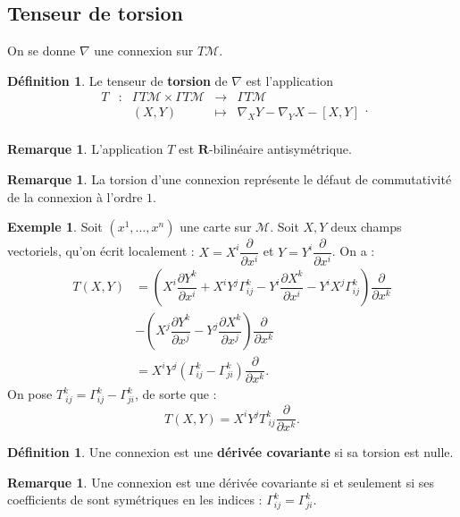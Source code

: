 \documentclass[12pt,a4paper]{article}
\theoremstyle{definition}
\newtheorem{defn}[thm]{Définition}
\newtheorem{ex}[thm]{Exemple}
\newtheorem{rqe}[thm]{Remarque}
\begin{document}
\subsection{Tenseur de torsion}
On se donne $\nabla$ une connexion sur $T\mathcal{M}$.
\begin{defn}
Le tenseur de \textbf{torsion} de $\nabla$ est l'application
$$\begin{array}{ccccc}
T & : & \Gamma T\mathcal{M}\times\Gamma T \mathcal{M} & \to & \Gamma  T\mathcal{M} \\
 & & (X,Y) & \mapsto & \nabla_XY-\nabla_YX-[X,Y]\\
\end{array}.$$
\end{defn}
\begin{rqe}
L'application $T$ est $\mathbf{R}$-bilinéaire antisymétrique.
\end{rqe}
\begin{rqe}
La torsion d'une connexion représente le défaut de commutativité de la connexion à l'ordre $1$.
\end{rqe}
\begin{ex}
Soit $(x^1,\ldots,x^n)$ une carte sur $\mathcal{M}$. Soit $X,Y$ deux champs vectoriels, qu'on écrit localement : $X=X^i\dfrac{\partial}{\partial x^i}$ et $Y=Y^i\dfrac{\partial}{\partial x^i}$. On a :
\begin{align*}
T(X,Y)&=\left(X^i\dfrac{\partial Y^k}{\partial x^i}+X^iY^j\Gamma_{ij}^k-Y^i\dfrac{\partial X^k}{\partial x^i}-Y^iX^j\Gamma_{ij}^k\right)\dfrac{\partial}{\partial x^k}\\&-\left(X^j\dfrac{\partial Y^k}{\partial x^j}-Y^j\dfrac{\partial X^k}{\partial x^j}\right)\dfrac{\partial}{\partial x^k}\\&=X^iY^j\left(\Gamma_{ij}^k-\Gamma_{ji}^k\right)\dfrac{\partial}{\partial x^k}.
\end{align*}
On pose $T^k_{~ij}=\Gamma_{ij}^k-\Gamma_{ji}^k$, de sorte que :
$$
T(X,Y)=X^iY^jT^k_{~ij}\dfrac{\partial}{\partial x^k}.
$$
\end{ex}
\begin{defn}
Une connexion est une \textbf{dérivée covariante} si sa torsion est nulle.
\end{defn}
\begin{rqe}
Une connexion est une dérivée covariante si et seulement si ses coefficients de  sont symétriques en les indices : $\Gamma_{ij}^k=\Gamma_{ji}^k$.
\end{rqe}
\newpage
\end{document}
